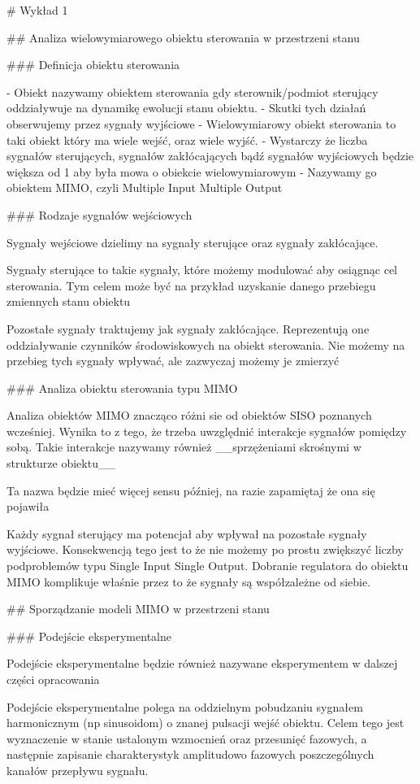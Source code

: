 \documentclass{article}
\begin{document}
	# Wykład 1

	## Analiza wielowymiarowego obiektu sterowania w przestrzeni stanu

	### Definicja obiektu sterowania

	- Obiekt nazywamy obiektem sterowania gdy sterownik/podmiot sterujący oddziaływuje
	na dynamikę ewolucji stanu obiektu.
	- Skutki tych działań obserwujemy przez sygnały wyjściowe
	- Wielowymiarowy obiekt sterowania to taki obiekt który ma wiele wejść,
	oraz wiele wyjść.
	- Wystarczy że liczba sygnałów sterujących, sygnałów zakłócających bądź sygnałów
	wyjściowych będzie większa od 1 aby była mowa o obiekcie wielowymiarowym
	- Nazywamy go obiektem MIMO, czyli Multiple Input Multiple Output

	### Rodzaje sygnałów wejściowych

	Sygnały wejściowe dzielimy na sygnały sterujące oraz sygnały zakłócające.

	Sygnały sterujące to takie sygnały, które możemy modulować aby osiągnąc cel sterowania.
	Tym celem może być na przykład uzyskanie danego przebiegu zmiennych stanu obiektu

	Pozostałe sygnały traktujemy jak sygnały zakłócające. Reprezentują one oddziaływanie
	czynników środowiskowych na obiekt sterowania. Nie możemy na przebieg tych
	sygnały wpływać, ale zazwyczaj możemy je zmierzyć

	### Analiza obiektu sterowania typu MIMO

	Analiza obiektów MIMO znacząco różni sie od obiektów SISO poznanych wcześniej.
	Wynika to z tego, że trzeba uwzględnić interakcje sygnałów pomiędzy sobą.
	Takie interakcje nazywamy również __sprzężeniami skrośnymi w strukturze obiektu__

	Ta nazwa będzie mieć więcej sensu później, na razie zapamiętaj że ona się pojawiła

	Każdy sygnał sterujący ma potencjał aby wpływał na pozostałe sygnały wyjściowe.
	Konsekwencją tego jest to że nie możemy po prostu zwiększyć liczby podproblemów
	typu Single Input Single Output. Dobranie regulatora do obiektu MIMO komplikuje
	właśnie przez to że sygnały są współzależne od siebie.

	## Sporządzanie modeli MIMO w przestrzeni stanu

	### Podejście eksperymentalne

	Podejście eksperymentalne będzie również nazywane eksperymentem w dalszej
	części opracowania

	Podejście eksperymentalne polega na oddzielnym pobudzaniu sygnałem harmonicznym
	(np sinusoidom) o znanej pulsacji wejść obiektu. Celem tego jest wyznaczenie w
	stanie ustalonym wzmocnień oraz przesunięć fazowych, a następnie zapisanie
	charakterystyk amplitudowo fazowych poszczególnych kanałów przepływu sygnału.
\end{document}
